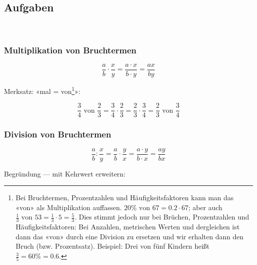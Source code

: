 
\subsection*{Aufgaben}


\newpage
\
\newpage


\subsubsection{Multiplikation von Bruchtermen}

\begin{gesetz}{}{}
$$\frac{a}{b}\cdot\frac{x}{y} = \frac{a\cdot x}{b\cdot y} = \frac{ax}{by}$$
\end{gesetz}

Merksatz:
«mal = von\footnote{Bei Bruchtermen, Prozentzahlen und
Häufigkeitsfaktoren kann man das «von» als Multiplikation
auffassen. $20\% \textrm{ von } 67 = 0.2 \cdot{} 67$; aber auch
$\frac{1}{3} \textrm{ von } 53
= \frac{1}{3}\cdot{5}=\frac{5}{3}$. Dies stimmt jedoch nur bei
Brüchen, Prozentzahlen und Häufigkeitsfaktoren: Bei Anzahlen,
metrischen Werten und dergleichen ist dann das «von» durch eine
Division zu ersetzen und wir erhalten dann den Bruch
(bzw. Prozentsatz). Beispiel: Drei von fünf Kindern heißt $\frac{3}{5}
= 60\% = 0.6$.}»:

$$\frac34 \textrm{ von } \frac23 = \frac34\cdot\frac23
=  \frac23\cdot\frac34 = \frac23 \textrm{ von } \frac34$$


\subsubsection{Division von Bruchtermen}
\begin{gesetz}{}{}
$$\frac{a}{b} : \frac{x}{y}=\frac{a}{b}\cdot\frac{y}{x} = \frac{a\cdot y}{b\cdot x} = \frac{ay}{bx}$$
\end{gesetz}

Begründung — mit Kehrwert erweitern:

